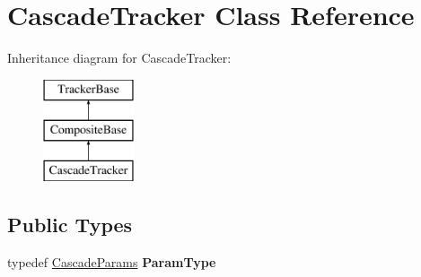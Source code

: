 \hypertarget{classCascadeTracker}{\section{Cascade\-Tracker Class Reference}
\label{classCascadeTracker}
}
Inheritance diagram for Cascade\-Tracker\-:\begin{figure}[H]
\begin{center}
\leavevmode
\includegraphics[height=3.000000cm]{classCascadeTracker}
\end{center}
\end{figure}
\subsection*{Public Types}
\begin{DoxyCompactItemize}
\item 
\hypertarget{classCascadeTracker_a950103310f4517611776669eae6ad803}{typedef \hyperlink{structCascadeParams}{Cascade\-Params} {\bfseries Param\-Type}}\label{classCascadeTracker_a950103310f4517611776669eae6ad803}

\end{DoxyCompactItemize}
